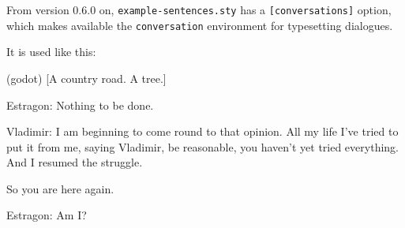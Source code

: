\documentclass{article}
\begin{document}
%
\noindent From version 0.6.0 on, \verb|example-sentences.sty| has a \verb|[conversations]| 
option, which makes available the \verb|conversation| environment for typesetting dialogues.

It is used like this:
\begin{examples}
    \item(godot) [A country road. A tree.]
    \begin{conversation}
        \item[Estragon:] Nothing to be done.
        \item[Vladimir:] I am beginning to come round to that opinion. All my life I've tried to put it from me, saying Vladimir, be reasonable, you haven't yet tried everything. And I resumed the struggle.

        So you are here again. 
        \item[Estragon:] Am I? 
    \end{conversation}
\end{examples}
\end{document}

